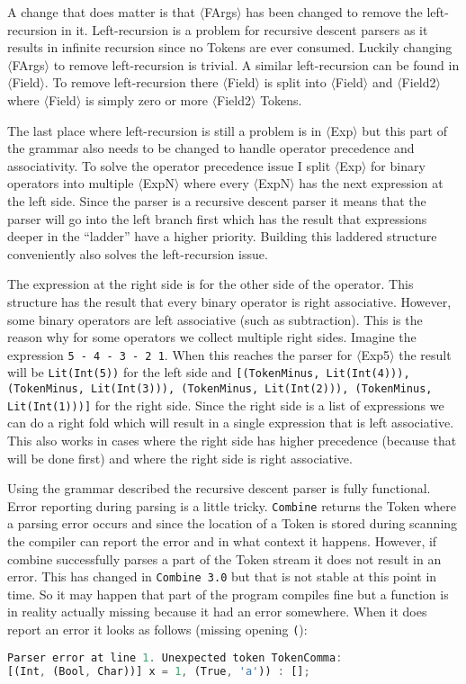 \documentclass{article}
\begin{document}
A change that does matter is that $\langle$FArgs$\rangle$ has been changed to remove the left-recursion in it. Left-recursion is a problem for recursive descent parsers as it results in infinite recursion since no Tokens are ever consumed. Luckily changing $\langle$FArgs$\rangle$ to remove left-recursion is trivial. A similar left-recursion can be found in $\langle$Field$\rangle$. To remove left-recursion there $\langle$Field$\rangle$ is split into $\langle$Field$\rangle$ and $\langle$Field2$\rangle$ where $\langle$Field$\rangle$ is simply zero or more $\langle$Field2$\rangle$ Tokens.

The last place where left-recursion is still a problem is in $\langle$Exp$\rangle$ but this part of the grammar also needs to be changed to handle operator precedence and associativity. To solve the operator precedence issue I split $\langle$Exp$\rangle$ for binary operators into multiple $\langle$ExpN$\rangle$ where every $\langle$ExpN$\rangle$ has the next expression at the left side. Since the parser is a recursive descent parser it means that the parser will go into the left branch first which has the result that expressions deeper in the ``ladder'' have a higher priority. Building this laddered structure conveniently also solves the left-recursion issue.

The expression at the right side is for the other side of the operator. This structure has the result that every binary operator is right associative. However, some binary operators are left associative (such as subtraction). This is the reason why for some operators we collect multiple right sides. Imagine the expression \texttt{5 - 4 - 3 - 2 1}. When this reaches the parser for $\langle$Exp5$\rangle$ the result will be \texttt{Lit(Int(5))} for the left side and \texttt{[(TokenMinus, Lit(Int(4))), (TokenMinus, Lit(Int(3))), (TokenMinus, Lit(Int(2))), (TokenMinus, Lit(Int(1)))]} for the right side. Since the right side is a list of expressions we can do a right fold which will result in a single expression that is left associative. This also works in cases where the right side has higher precedence (because that will be done first) and where the right side is right associative.

Using the grammar described the recursive descent parser is fully functional. Error reporting during parsing is a little tricky. \texttt{Combine} returns the Token where a parsing error occurs and since the location of a Token is stored during scanning the compiler can report the error and in what context it happens. However, if combine successfully parses a part of the Token stream it does not result in an error. This has changed in \texttt{Combine 3.0} but that is not stable at this point in time. So it may happen that part of the program compiles fine but a function is in reality actually missing because it had an error somewhere. When it does report an error it looks as follows (missing opening \texttt{(}):
\begin{lstlisting}[language=Rust, style=boxed]
Parser error at line 1. Unexpected token TokenComma:
[(Int, (Bool, Char))] x = 1, (True, 'a')) : [];
\end{lstlisting}
\end{document}
